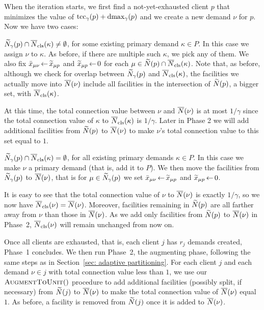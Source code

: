 When the iteration starts, we first find a not-yet-exhausted client
$p$ that minimizes the value of $\mbox{\rm{tcc}}_\gamma(p) + \text{dmax}_\gamma(p)$ and
we create a new demand $\nu$ for $p$.  Now we have two cases:
%
\begin{description}
%
\item{} ${\widetilde N}_{\gamma}(p) \cap
  {\overline{N}}_{\text{cls}}(\kappa)\neq\emptyset$, for some existing primary demand
  $\kappa\in P$.  In this case we assign $\nu$ to $\kappa$. As before, if
  there are multiple such $\kappa$, we pick any of them. We also fix
  ${\bar x}_{\mu \nu} {\,\leftarrow\,} {\widetilde x}_{\mu p}$ and ${\widetilde x}_{\mu p}{\,\leftarrow\,} 0$
  for each $\mu \in {\widetilde N}(p)\cap {\overline{N}}_{\text{cls}}(\kappa)$. Note that, as before,
  although we check for overlap between ${\widetilde N}_{\gamma}(p)$ and
  ${\overline{N}}_{\text{cls}}(\kappa)$, the facilities we actually move into
  ${\overline{N}}(\nu)$ include all facilities in the intersection of
  ${\widetilde N}(p)$, a bigger set, with ${\overline{N}}_{\text{cls}}(\kappa)$.

  At this time, the total connection value between $\nu$ and ${\overline{N}}(\nu)$ is
  at most $1/\gamma$ since the total connection value of $\kappa$ to
  ${\overline{N}}_{\text{cls}}(\kappa)$ is $1/\gamma$. Later in Phase 2 we will add
  additional facilities from ${\widetilde N}(p)$ to ${\overline{N}}(\nu)$ to make $\nu$'s total connection value to this set
  equal to $1$. 

%
\item{} ${\widetilde N}_{\gamma}(p) \cap {\overline{N}}_{\text{cls}}(\kappa) =
  \emptyset$, for all existing primary demands $\kappa\in P$.  In this case
  we make $\nu$ a primary demand (that is, add it to $P$). 
  We then move the facilities from ${\widetilde N}_{\gamma}(p)$ to ${\overline{N}}(\nu)$, that is
  for $\mu \in {\widetilde N}_{\gamma}(p)$
	we set ${\bar x}_{\mu \nu}{\,\leftarrow\,} {\widetilde x}_{\mu p}$  and   ${\widetilde x}_{\mu p}\,{\leftarrow}\, 0$.  

  It is easy to see that the total connection value of $\nu$ to ${\overline{N}}(\nu)$
  is exactly $1/\gamma$, so we now have ${\overline{N}}_{\text{cls}}(\nu) = {\overline{N}}(\nu)$.
Moreover, facilities remaining in
  ${\widetilde N}(p)$ are all farther away from $\nu$ than those in
  ${\overline{N}}(\nu)$. As we add only facilities from ${\widetilde N}(p)$ to ${\overline{N}}(\nu)$
  in Phase~2, ${\overline{N}}_{\text{cls}}(\nu)$ will remain unchanged from now on.
%
\end{description}
%
Once all clients are exhausted, that is, each client $j$ has $r_j$
demands created, Phase~1 concludes. We then run Phase~2, the
augmenting phase, following the same steps as in Section~\ref{sec: adaptive partitioning}.
For each client $j$ and each demand $\nu\in j$ with total connection
value less than $1$, we use our ${\textsc{AugmentToUnit}}()$ procedure to add
additional facilities (possibly split, if necessary) from
${\widetilde N}(j)$ to ${\overline{N}}(\nu)$ to make the total connection value of ${\overline{N}}(\nu)$
equal $1$. As before, a facility is removed from
${\widetilde N}(j)$ once it is added to ${\overline{N}}(\nu)$.  

